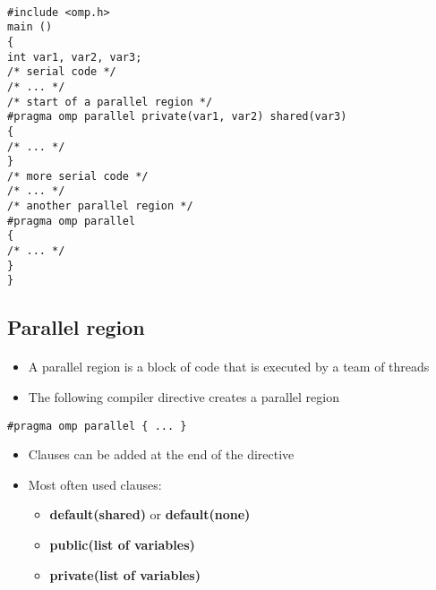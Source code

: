 \paragraph{}




















\begin{verbatim}
#include <omp.h>
main ()
{
int var1, var2, var3;
/* serial code */
/* ... */
/* start of a parallel region */
#pragma omp parallel private(var1, var2) shared(var3)
{
/* ... */
}
/* more serial code */
/* ... */
/* another parallel region */
#pragma omp parallel
{
/* ... */
}
}

\end{verbatim}



\subsection*{Parallel region}

\paragraph{}
\begin{itemize}
\item A parallel region is a block of code that is executed by a team of threads

\item The following compiler directive creates a parallel region
\end{itemize}

\noindent


\begin{verbatim}
#pragma omp parallel { ... }

\end{verbatim}

\begin{itemize}
\item Clauses can be added at the end of the directive

\item Most often used clauses:
\begin{itemize}

 \item \textbf{default(shared)} or \textbf{default(none)}

 \item \textbf{public(list of variables)}

 \item \textbf{private(list of variables)}
\end{itemize}

\noindent
\end{itemize}

